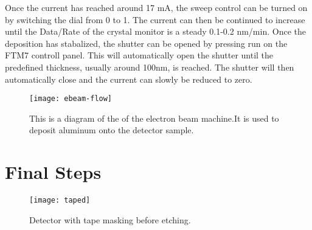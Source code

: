 Once the current has reached around 17 mA, the sweep control can be turned on by switching the dial from 0 to 1.
The current can then be continued to increase until the Data/Rate of the crystal monitor is a steady 0.1-0.2 nm/min.
Once the deposition has stabalized, the shutter can be opened by pressing run on the FTM7 controll panel.
This will automatically open the shutter until the predefined thickness, usually around 100nm, is reached.
The shutter will then automatically close and the current can slowly be reduced to zero.

\begin{sidewaysfigure}
\texttt{[image: ebeam-flow]}
\caption{This is a diagram of the of the electron beam machine.It is used to deposit aluminum onto the detector sample.}
\label{fig:ebeam-flow}
\end{sidewaysfigure}

\section{Final Steps}

\begin{figure}[htpb]
\centering
\texttt{[image: taped]}
\caption{Detector with tape masking before etching.}
\label{fig:taped}
\end{figure}

